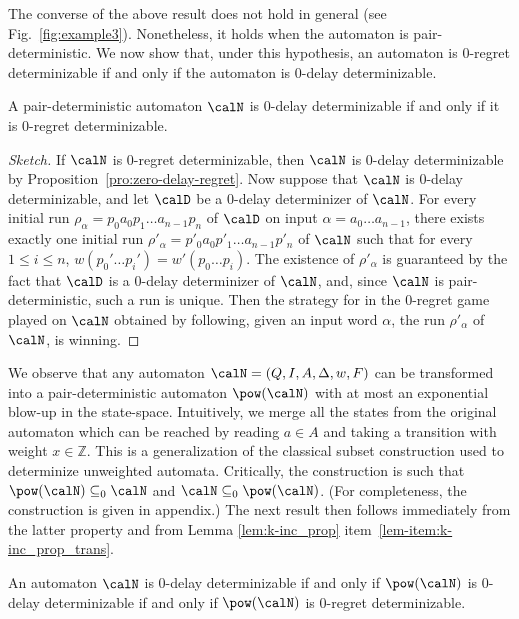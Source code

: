 \documentclass[a4paper]{article}
\begin{document}
The converse of the above result does not hold in general (see
Fig.~\ref{fig:example3}). Nonetheless, it holds when the automaton is
pair-deterministic. We now show that, under this hypothesis, an automaton is
$0$-regret determinizable if and only if the automaton is $0$-delay
determinizable.

\begin{proposition}\label{pro:zero-delay-regret-pdet}
	A pair-deterministic automaton $\calN$ is $0$-delay
	determinizable if and only if it is $0$-regret determinizable.
\end{proposition}

\begin{proof}[Sketch]
	If $\calN$ is $0$-regret determinizable, then $\calN$ is $0$-delay
	determinizable by Proposition~\ref{pro:zero-delay-regret}. Now suppose
	that $\calN$ is $0$-delay determinizable, and let $\calD$ be a $0$-delay
	determinizer of $\calN$. For every initial run
	$\rho_{\alpha} = p_0 a_0 p_1 \ldots a_{n-1} p_{n}$ of $\calD$ on input
	$\alpha = a_0 \ldots a_{n-1}$, there exists exactly one initial run
	$\rho'_{\alpha} = p'_0 a_0 p'_1 \ldots a_{n-1} p'_{n}$ of $\calN$ such
	that for every $1 \leq i \leq n$, $w(p_0' \dots p_i') = w'(p_0 \dots
	p_i)$.  The existence of $\rho'_{\alpha}$ is guaranteed by the fact
	that $\calD$ is a $0$-delay determinizer of $\calN$, and, since $\calN$
	is pair-deterministic, such a run is unique. Then the strategy for \eve
	in the $0$-regret game played on $\calN$ obtained by following, given an
	input word $\alpha$, the run $\rho'_{\alpha}$ of $\calN$, is winning.
\end{proof}

We observe that any automaton $\calN = (Q,I,A,\Delta,w,F)$ can be transformed
into a pair-deterministic automaton $\pow(\calN)$ with at most an exponential
blow-up in the state-space.  Intuitively, we merge all the states from the
original automaton which can be reached by reading $a \in A$ and taking a
transition with weight $x \in \mathbb{Z}$. This is a generalization of the
classical subset construction used to determinize unweighted automata.
Critically, the construction is such that $\pow(\calN) \subseteq_0 \calN$ and
$\calN \subseteq_0 \pow(\calN)$. (For completeness, the construction is given in
appendix.) The next result then follows immediately from the latter property and
from Lemma \ref{lem:k-inc_prop} item~\ref{lem-item:k-inc_prop_trans}.

\begin{proposition}\label{pro:zero-delay-subset}
	An automaton $\calN$ is $0$-delay determinizable if and only if
	$\pow(\calN)$ is $0$-delay determinizable if and only if $\pow(\calN)$
	is $0$-regret determinizable.
\end{proposition}
\end{document}
